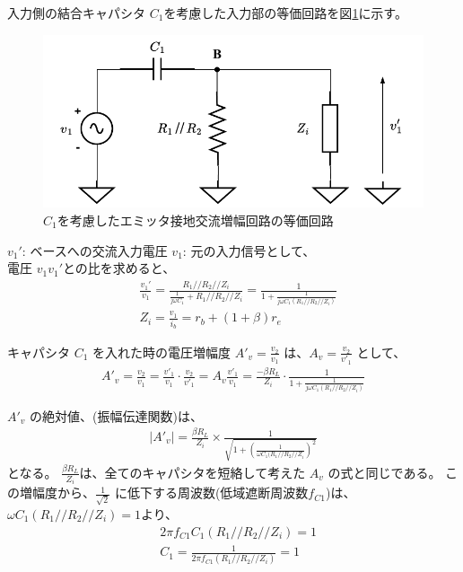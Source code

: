   入力側の結合キャパシタ $C_1$を考慮した入力部の等価回路を図\ref{C1}に示す。

  \begin{figure}[htbp]
    \begin{center}
    \includegraphics[width=0.8\linewidth]{img/49.pdf}
    \caption{$C_1$を考慮したエミッタ接地交流増幅回路の等価回路}
    \label{C1}
    \end{center}
  \end{figure}
  $v_1'$: ベースへの交流入力電圧 $v_1$: 元の入力信号として、\\
  電圧 $v_1$$v_1'$との比を求めると、
  \begin{align}
    & \frac{v_1'}{v_1} = \frac{R_1//R_2//Z_i}{\frac{1}{j\omega C_1}+R_1//R_2//Z_i} = \frac{1}{1+\frac{1}{j\omega C_1(R_1//R_2//Z_i)}}\\
    & Z_i = \frac{v_1}{i_b} = r_b+(1+\beta)r_e    
  \end{align}

  キャパシタ $C_1$ を入れた時の電圧増幅度 $A'_v = \frac{v_2}{v_1}$ は、$A_v = \frac{v_2}{v'_1}$ として、
  \begin{align}
    A'_v = \frac{v_2}{v_1} = \frac{v'_1}{v_1}\cdot\frac{v_2}{v'_1} = A_v\frac{v'_1}{v_1} = \frac{-\beta R_L}{Z_i} \cdot \frac{1}{1+\frac{1}{j\omega C_1(R_1//R_2//Z_i)}}    
  \end{align}

  $A'_v$ の絶対値、(振幅伝達関数)は、
  \begin{align}
    |A'_v| = \frac{\beta R_L}{Z_i} \times \frac{1}{\sqrt{1+(\frac{1}{\omega C_1(R_1//R_2//Z_i})^2}}
  \end{align}
  となる。
  $\frac{\beta R_L}{Z_i}$は、全てのキャパシタを短絡して考えた $A_v$ の式と同じである。
  この増幅度から、$\frac{1}{\sqrt{2}}$ に低下する周波数(低域遮断周波数$f_{C1}$)は、
  $\omega C_1(R_1//R_2//Z_i) = 1$より、
  \begin{align}
    & 2\pi f_{C1}C_1(R_1 // R_2 // Z_i) = 1\\
    & C_1 = \frac{1}{2\pi f_{C1} (R_1//R_2//Z_i)} = 1    
  \end{align}


